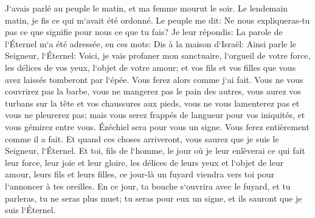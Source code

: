 \verse J`avais parlé au peuple le matin, et ma femme mourut le soir. Le lendemain matin, je fis ce qui m`avait été ordonné. 
\verse Le peuple me dit: Ne nous expliqueras-tu pas ce que signifie pour nous ce que tu fais? 
\verse Je leur répondis: La parole de l`Éternel m`a été adressée, en ces mots: 
\verse Dis à la maison d`Israël: Ainsi parle le Seigneur, l`Éternel: Voici, je vais profaner mon sanctuaire, l`orgueil de votre force, les délices de vos yeux, l`objet de votre amour; et vos fils et vos filles que vous avez laissés tomberont par l`épée. 
\verse Vous ferez alors comme j`ai fait. Vous ne vous couvrirez pas la barbe, vous ne mangerez pas le pain des autres, 
\verse vous aurez vos turbans sur la tête et vos chaussures aux pieds, vous ne vous lamenterez pas et vous ne pleurerez pas; mais vous serez frappés de langueur pour vos iniquités, et vous gémirez entre vous. Ézéchiel sera pour vous un signe. 
\verse Vous ferez entièrement comme il a fait. Et quand ces choses arriveront, vous saurez que je suis le Seigneur, l`Éternel. 
\verse Et toi, fils de l`homme, le jour où je leur enlèverai ce qui fait leur force, leur joie et leur gloire, les délices de leurs yeux et l`objet de leur amour, leurs fils et leurs filles, 
\verse ce jour-là un fuyard viendra vers toi pour l`annoncer à tes oreilles. 
\verse En ce jour, ta bouche s`ouvrira avec le fuyard, et tu parleras, tu ne seras plus muet; tu seras pour eux un signe, et ils sauront que je suis l`Éternel. 

